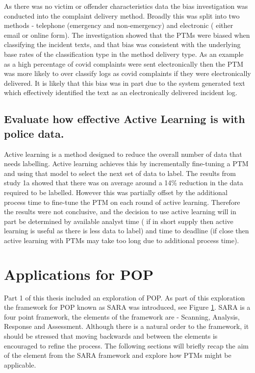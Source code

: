 As there was no victim or offender characteristics data the bias investigation was conducted into the complaint delivery method. Broadly this was split into two methods - telephone (emergency and non-emergency) and electronic ( either email or online form). The investigation showed that the PTMs were biased when classifying the incident texts, and that bias was consistent with the underlying base rates of the classification type in the method delivery type. As an example as a high percentage of covid complaints were sent electronically then the PTM was more likely to over classify logs as covid complaints if they were electronically delivered.  It is likely that this bias was in part due to the system generated text which effectively identified the text as an electronically delivered incident log.

\subsection{Evaluate how effective Active Learning is with police data.}  Active learning is a method designed to reduce the overall number of data that needs labelling. Active learning achieves this by incrementally fine-tuning a PTM and using that model to select the next set of data to label. The results from study 1a showed that there was on average around a 14\% reduction in the data required to be labelled. However this was partially offset by the additional process time to fine-tune the PTM on each round of active learning. Therefore the results were not conclusive, and the decision to use active learning will in part be determined by available analyst time ( if in short supply then active learning is useful as there is less data to label)  and time to deadline (if close then active learning with PTMs may take too long due to additional process time).


\section{Applications for POP} Part 1 of this thesis included an exploration of POP. As part of this exploration the framework for POP known as SARA was introduced, see Figure \ref{}. SARA is a four point framework, the elements of the framework are - Scanning, Analysis, Response and Assessment.  Although there is a natural order to the framework, it should be stressed that moving backwards and between the elements is encouraged to refine the process.  The following sections will briefly recap the aim of the element from the SARA framework and explore how PTMs might be applicable.

